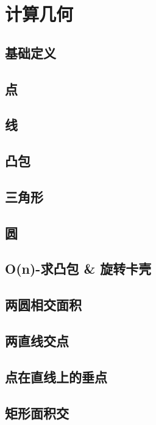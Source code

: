 \documentclass{ctexart}
\begin{document}
\section{计算几何}
\subsection{基础定义}

\subsection{点}

\subsection{线}

\subsection{凸包}

\subsection{三角形}

\subsection{圆}



\subsection{O(n)-求凸包 \& 旋转卡壳}

\subsection{两圆相交面积}

\subsection{两直线交点}

\subsection{点在直线上的垂点}

\subsection{矩形面积交}

\end{document}
